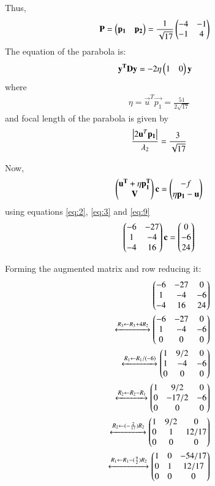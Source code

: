 \documentclass[journal,12pt,twocolumn]{IEEEtran}
\begin{document}
Thus,
\begin{align}
		\mathbf{P}&=\begin{pmatrix}\mathbf{p_1}&\mathbf{p_2}\end{pmatrix}=\frac{1}{\sqrt{17}} \begin{pmatrix}-4 & -1\\ -1 & 4\end{pmatrix} 
\end{align}
The equation of the parabola is:
\begin{align}
		\mathbf{y^T}\mathbf{D}\mathbf{y}&=-2\eta\begin{pmatrix}1&0\end{pmatrix}\mathbf{y}
\end{align}
where
\begin{align}
		\eta=\vec{u}^T\vec{p_1}=\frac{51}{2\sqrt{17}}
\end{align}
and focal length of the parabola is given by 
\begin{align}
	\frac{\left\vert2\mathbf{u}^T\mathbf{p_1}\right\vert}{\lambda_2}	= \frac{3}{\sqrt{17}}
\end{align}

Now,
\begin{align}
		\begin{pmatrix}\mathbf{u^T}+\eta\mathbf{p_1^T} \\ \mathbf{V}\end{pmatrix}\mathbf{c}=
		\begin{pmatrix}-f \\ \eta\mathbf{p_1}-\mathbf{u}\end{pmatrix} \label{eq:9}
\end{align}
using equations \eqref{eq:2}, \eqref{eq:3} and \eqref{eq:9}
\begin{align}
	\begin{pmatrix}-6& -27 \\ 1 & -4 \\  -4 & 16 \end{pmatrix}\mathbf{c}=\begin{pmatrix}0 \\ -6\\ 24\end{pmatrix} 
\end{align}

Forming the augmented matrix and row reducing it:
\begin{align}
		\begin{pmatrix}-6 & -27 & 0\\1 & -4 & -6 \\-4 & 16 & 24\end{pmatrix}\\
		\xleftrightarrow[]{R_3\leftarrow R_3+ 4R_2} 
		\begin{pmatrix}-6 & -27 & 0\\1 & -4 & -6 \\0 & 0 &0 \end{pmatrix}\\
		\xleftrightarrow[]{R_1\leftarrow R_1/(-6)} 
		\begin{pmatrix}1 & 9/2 & 0\\1 & -4 & -6\\0 & 0 &0 \end{pmatrix}\\
		\xleftrightarrow[]{R_2\leftarrow R_2-R_1} 
		\begin{pmatrix}1 & 9/2 & 0\\0 & -17/2 & -6 \\0 & 0 &0 \end{pmatrix}\\
		\xleftrightarrow[]{R_2\leftarrow (-\frac{2}{17})R_2}
		\begin{pmatrix}1 & 9/2 & 0\\0 & 1 & 12/17\\0 & 0 &0\end{pmatrix}\\ 
		\xleftrightarrow[]{R_1\leftarrow R_1 -(\frac{9}{2})R_2}
		\begin{pmatrix}1 & 0 & -54/17\\0 & 1 & 12/17 \\0 & 0 &0\end{pmatrix}
\end{align}
\end{document}
